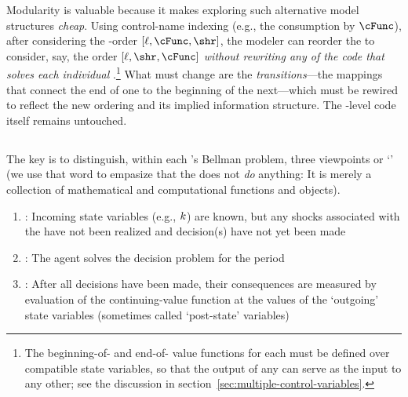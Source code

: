 
Modularity is valuable because it makes exploring such alternative model structures \textit{cheap}.  Using control-name indexing (e.g., the consumption {\stg} by $\cFunc$), after considering the {\stg}-order $[\ell,\cFunc,\shr]$, the modeler can reorder the {\stgs} to consider, say, the order $[\ell,\shr,\cFunc]$ \textit{without rewriting any of the code that solves each individual {\stg}}.\footnote{The beginning-of-{\stg} and end-of-{\stg} value functions for each {\stg} must be defined over compatible state variables, so that the output of any {\stg} can serve as the input to any other; see the discussion in section~\ref{sec:multiple-control-variables}.
}  What must change are the \textit{transitions}---the mappings that connect the end of one {\stg} to the beginning of the next---which must be rewired to reflect the new ordering and its implied information structure.  The {\stg}-level code itself remains untouched.

\hypertarget{prchs}{}
\subsection{\Prchs}\label{subsec:prchs}

The key is to distinguish, within each {\stg}'s Bellman problem, three viewpoints or `{\prchs}' (we use that word to empasize that the {\prch} does not \textit{do} anything: It is merely a collection of mathematical and computational functions and objects).
\begin{enumerate}
\item \textbf{\Arrival}: Incoming state variables (e.g., $k$) are known, but any shocks associated with the {\stg} have not been realized and decision(s) have not yet been made
\item \textbf{\Decision}: The agent solves the decision problem for the period
\item \textbf{\Continuation}: After all decisions have been made, their consequences are measured by evaluation of the continuing-value function at the values of the `outgoing' state variables (sometimes called `post-state' variables)
\end{enumerate}

